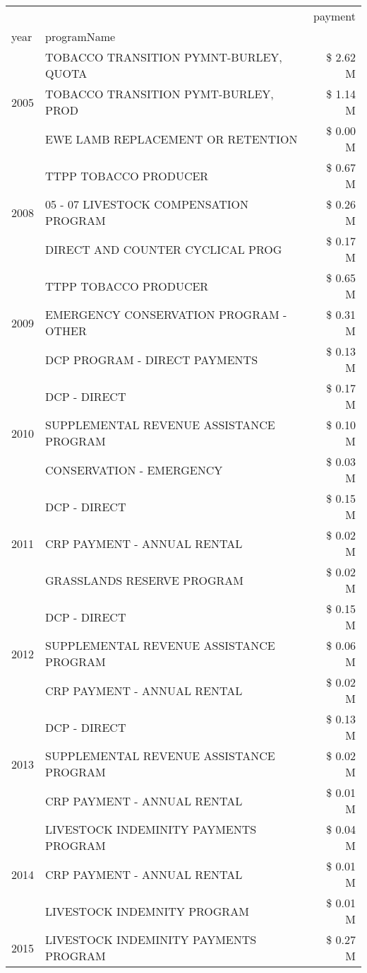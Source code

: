 \begin{tabular}{llr}
\toprule
 &  & payment \\
year & programName &  \\
\midrule
\multirow[t]{3}{*}{2005} & TOBACCO TRANSITION PYMNT-BURLEY, QUOTA & \$ 2.62 M \\
 & TOBACCO TRANSITION PYMT-BURLEY, PROD & \$ 1.14 M \\
 & EWE LAMB REPLACEMENT OR RETENTION & \$ 0.00 M \\
\cline{1-3}
\multirow[t]{3}{*}{2008} & TTPP TOBACCO PRODUCER & \$ 0.67 M \\
 & 05 - 07 LIVESTOCK COMPENSATION PROGRAM & \$ 0.26 M \\
 & DIRECT AND COUNTER CYCLICAL PROG & \$ 0.17 M \\
\cline{1-3}
\multirow[t]{3}{*}{2009} & TTPP TOBACCO PRODUCER & \$ 0.65 M \\
 & EMERGENCY CONSERVATION PROGRAM - OTHER & \$ 0.31 M \\
 & DCP PROGRAM - DIRECT PAYMENTS & \$ 0.13 M \\
\cline{1-3}
\multirow[t]{3}{*}{2010} & DCP - DIRECT & \$ 0.17 M \\
 & SUPPLEMENTAL REVENUE ASSISTANCE PROGRAM & \$ 0.10 M \\
 & CONSERVATION - EMERGENCY & \$ 0.03 M \\
\cline{1-3}
\multirow[t]{3}{*}{2011} & DCP - DIRECT & \$ 0.15 M \\
 & CRP PAYMENT - ANNUAL RENTAL & \$ 0.02 M \\
 & GRASSLANDS RESERVE PROGRAM & \$ 0.02 M \\
\cline{1-3}
\multirow[t]{3}{*}{2012} & DCP - DIRECT & \$ 0.15 M \\
 & SUPPLEMENTAL REVENUE ASSISTANCE PROGRAM & \$ 0.06 M \\
 & CRP PAYMENT - ANNUAL RENTAL & \$ 0.02 M \\
\cline{1-3}
\multirow[t]{3}{*}{2013} & DCP - DIRECT & \$ 0.13 M \\
 & SUPPLEMENTAL REVENUE ASSISTANCE PROGRAM & \$ 0.02 M \\
 & CRP PAYMENT - ANNUAL RENTAL & \$ 0.01 M \\
\cline{1-3}
\multirow[t]{3}{*}{2014} & LIVESTOCK INDEMINITY PAYMENTS PROGRAM & \$ 0.04 M \\
 & CRP PAYMENT - ANNUAL RENTAL & \$ 0.01 M \\
 & LIVESTOCK INDEMNITY PROGRAM & \$ 0.01 M \\
\cline{1-3}
\multirow[t]{3}{*}{2015} & LIVESTOCK INDEMINITY PAYMENTS PROGRAM & \$ 0.27 M \\

\end{tabular}
